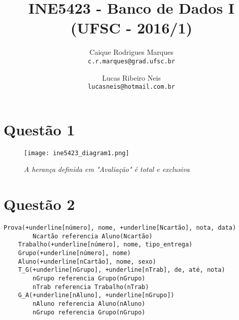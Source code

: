 \documentclass{article}
\title{\textbf{INE5423 - Banco de Dados I (UFSC - 2016/1)}}
\author{
    Caique Rodrigues Marques \\
    {\texttt{c.r.marques@grad.ufsc.br}}
    \and
    Lucas Ribeiro Neis \\
    {\texttt{lucasneis@hotmail.com.br}}
    \vspace{-5mm}
}
\date{}
\begin{document}
\maketitle

\section*{Questão 1}
    \begin{figure*}[h!]
        \centering
        \texttt{[image: ine5423\_diagram1.png]}
        \caption*{\textit{A herança definida em "Avaliação" é total e exclusiva}}
    \end{figure*}
    
\section*{Questão 2}
    \begin{Verbatim}[commandchars=+\[\]]
    Prova(+underline[número], nome, +underline[Ncartão], nota, data)
        Ncartão referencia Aluno(Ncartão)
    Trabalho(+underline[número], nome, tipo_entrega)
    Grupo(+underline[número], nome)
    Aluno(+underline[nCartão], nome, sexo)
    T_G(+underline[nGrupo], +underline[nTrab], de, até, nota)
        nGrupo referencia Grupo(nGrupo)
        nTrab referencia Trabalho(nTrab)
    G_A(+underline[nAluno], +underline[nGrupo])
        nAluno referencia Aluno(nAluno)
        nGrupo referencia Grupo(nGrupo)
    \end{Verbatim}
\end{document}
